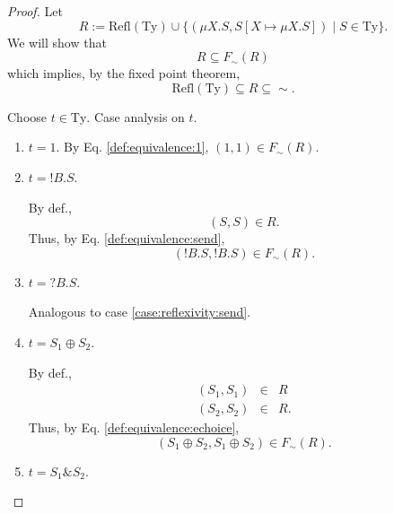 \documentclass{llncs}
\newcommand*{\Refl}{\mathrm{Refl}}
\newcommand*{\Ty}{\mathrm{Ty}}
\newcommand*{\sequiv}{\sim}
\newcommand*{\union}{\cup}
\newcommand*{\send}{\mathord{!}}
\newcommand*{\recv}{\mathord{?}}
\newcommand*{\echoice}{\oplus}
\newcommand*{\ichoice}{\mathop{\&}}
\renewcommand*{\|}{\;|\;}
\begin{document}
\begin{proof}
  Let
  \begin{equation*}
    R := \Refl(\Ty) \union \{ (\mu X.S, S[X \mapsto \mu X.S]) \| S \in \Ty \}.
  \end{equation*}
  We will show that
  \begin{equation*}
    R \subseteq F_\sequiv(R)
  \end{equation*}
  which implies, by the fixed point theorem,
  \begin{equation*}
    \Refl(\Ty) \subseteq R \subseteq \sequiv.
  \end{equation*}

  Choose $t \in \Ty$. Case analysis on $t$.

  \begin{enumerate}
    \item
      \label{case:reflexivity:1}
      $t = 1$. By Eq. \ref{def:equivalence:1}, $(1,1) \in F_\sequiv(R)$.

    \item
      \label{case:reflexivity:send}
      $t = \send B.S$.

      By def.,
      \begin{equation*}
        (S, S) \in R.
      \end{equation*}
      Thus, by Eq. \ref{def:equivalence:send},
      \begin{equation*}
        (\send B.S, \send B.S) \in F_\sequiv(R).
      \end{equation*}

    \item
      \label{case:reflexivity:recv}
      $t = \recv B.S$.

      Analogous to case \ref{case:reflexivity:send}.

    \item
      \label{case:reflexivity:echoice}
      $t = S_1 \echoice S_2$.

      By def.,
      \begin{eqnarray*}
        (S_1, S_1) &\in& R \\
        (S_2, S_2) &\in& R.
      \end{eqnarray*}
      Thus, by Eq. \ref{def:equivalence:echoice},
      \begin{equation*}
        (S_1 \echoice S_2, S_1 \echoice S_2) \in F_\sequiv(R).
      \end{equation*}

    \item
      \label{case:reflexivity:ichoice}
      $t = S_1 \ichoice S_2$.


\end{enumerate}
\end{proof}
\end{document}
